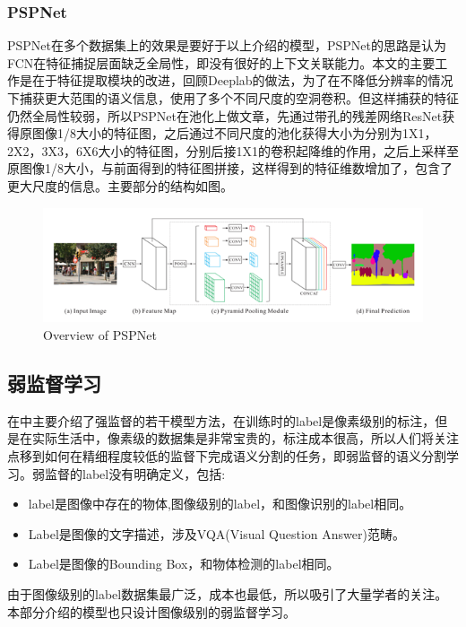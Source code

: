 \documentclass{article}
\begin{document}
\begin{CJK}{UTF8}{gbsn}
\subsubsection{PSPNet}
PSPNet\cite{zhao2017pyramid}在多个数据集上的效果是要好于以上介绍的模型，PSPNet\cite{zhao2017pyramid}的思路是认为FCN\cite{long2015fully}在特征捕捉层面缺乏全局性，即没有很好的上下文关联能力。本文的主要工作是在于特征提取模块的改进，回顾Deeplab\cite{chen2014semantic}的做法，为了在不降低分辨率的情况下捕获更大范围的语义信息，使用了多个不同尺度的空洞卷积。但这样捕获的特征仍然全局性较弱，所以PSPNet\cite{zhao2017pyramid}在池化上做文章，先通过带孔的残差网络ResNet\cite{he2016deep}获得原图像1/8大小的特征图，之后通过不同尺度的池化获得大小为分别为1X1，2X2，3X3，6X6大小的特征图，分别后接1X1的卷积起降维的作用，之后上采样至原图像1/8大小，与前面得到的特征图拼接，这样得到的特征维数增加了，包含了更大尺度的信息。主要部分的结构如图\cite{PSPNet}。
\begin{figure}[h]
    \centering
    \includegraphics[scale=0.7]{imgs/2-5_Overview_of_PSPNet.png}
    \caption{Overview of PSPNet}
    \label{PSPNet}
\end{figure}

\subsection{弱监督学习}
\label{weakly}
在\cite{strong}中主要介绍了强监督的若干模型方法，在训练时的label是像素级别的标注，但是在实际生活中，像素级的数据集是非常宝贵的，标注成本很高，所以人们将关注点移到如何在精细程度较低的监督下完成语义分割的任务，即弱监督的语义分割学习。弱监督的label没有明确定义，包括:
\begin{itemize}
\item label是图像中存在的物体,图像级别的label，和图像识别的label相同。
\item Label是图像的文字描述，涉及VQA(Visual Question Answer)范畴。
\item Label是图像的Bounding Box，和物体检测的label相同。
\end{itemize}

由于图像级别的label数据集最广泛，成本也最低，所以吸引了大量学者的关注。本部分介绍的模型也只设计图像级别的弱监督学习。


\end{CJK}
\end{document}
